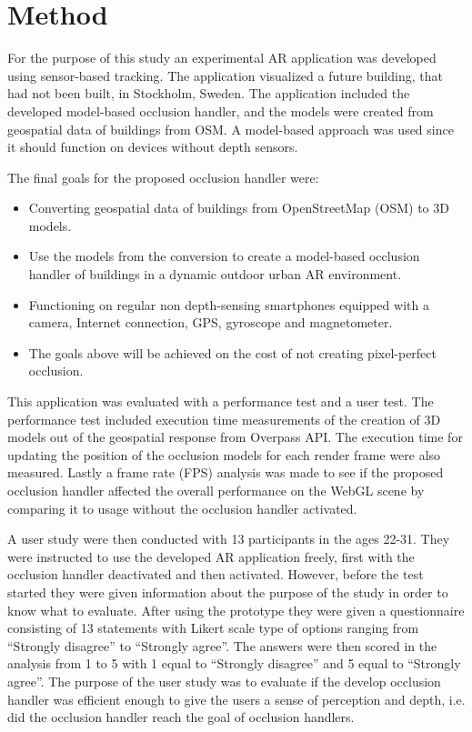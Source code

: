 \section{Method}
For the purpose of this study an experimental AR application was developed using sensor-based tracking. The application visualized a future building, that had not been built, in Stockholm, Sweden. The application included the developed model-based occlusion handler, and the models were created from geospatial data of buildings from OSM. A model-based approach was used since it should function on devices without depth sensors. 

The final goals for the proposed occlusion handler were:
\begin{itemize}
\item Converting geospatial data of buildings from OpenStreetMap (OSM) to 3D models.
\item Use the models from the conversion to create a model-based occlusion handler of buildings in a dynamic outdoor urban AR environment.
\item Functioning on regular non depth-sensing smartphones equipped with a camera, Internet connection, GPS, gyroscope and magnetometer.
\item The goals above will be achieved on the cost of not creating pixel-perfect occlusion.
\end{itemize}

This application was evaluated with a performance test and a user test. The performance test included execution time measurements of the creation of 3D models out of the geospatial response from Overpass API. The execution time for updating the position of the occlusion models for each render frame were also measured. Lastly a frame rate (FPS) analysis was made to see if the proposed occlusion handler affected the overall performance on the WebGL scene by comparing it to usage without the occlusion handler activated.

A user study were then conducted with 13 participants in the ages 22-31. They were instructed to use the developed AR application freely, first with the occlusion handler deactivated and then activated. However, before the test started they were given information about the purpose of the study in order to know what to evaluate. After using the prototype they were given a questionnaire consisting of 13 statements with Likert scale \cite{likert1932technique} type of options ranging from ``Strongly disagree'' to ``Strongly agree''. The answers were then scored in the analysis from 1 to 5 with 1 equal to ``Strongly disagree'' and 5 equal to ``Strongly agree''. The purpose of the user study was to evaluate if the develop occlusion handler was efficient enough to give the users a sense of perception and depth, i.e. did the occlusion handler reach the goal of occlusion handlers. 

